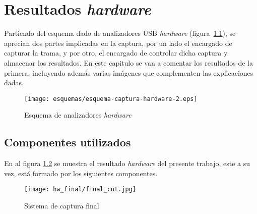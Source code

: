 \chapter{Resultados \emph{hardware}}
\label{ch:resultados_hw}



Partiendo del esquema dado de analizadores USB \emph{hardware} (figura~\ref{fig:esquema-hardware}), se aprecian dos partes implicadas en la captura, por un lado el encargado de capturar la trama, y por otro, el encargado de controlar dicha captura y almacenar los resultados. En este capitulo se van a comentar los resultados de la primera, incluyendo además varias imágenes que complementen las explicaciones dadas.

\begin{figure}[htb]
    \centering
    \texttt{[image: esquemas/esquema-captura-hardware-2.eps]}
    \caption{Esquema de analizadores \emph{hardware}}
    \label{fig:esquema-hardware}
\end{figure}

\section{Componentes utilizados}
En al figura \ref{fig:sistema_final} se muestra el resultado \emph{hardware} del presente trabajo, este a su vez, está formado por los siguientes componentes.

\begin{figure}[htbp]
    \centering
    \texttt{[image: hw\_final/final\_cut.jpg]}
    \caption{Sistema de captura final}
    \label{fig:sistema_final}
\end{figure}

